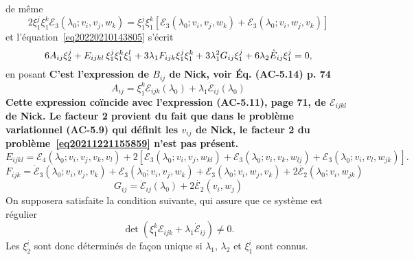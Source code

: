 \documentclass[12pt, final]{amsart}
\begin{document}
de m{\^e}me
\begin{equation}
  2 \xi_1^j \xi_1^k \mathcal{E}_3 (\lambda_0 ; v_i, v_j, w_k) = \xi_1^j
  \xi_1^k  [\mathcal{E}_3 (\lambda_0 ; v_i, v_j, w_k) +\mathcal{E}_3
  (\lambda_0 ; v_i, w_j, v_k)]
\end{equation}
et l'équation~\eqref{eq20220210143805} s'écrit
\begin{equation}
  \label{eq20220216141706} 6 A_{i  j} \xi_2^j + E_{i  j
   k  l}  \hspace{0.17em} \xi_1^j \xi_1^k \xi_1^l + 3
  \lambda_1 F_{i  j  k} \xi_1^j \xi_1^k + 3 \lambda_1^2 G_{i
   j} \xi_1^j + 6 \lambda_2  \mathring{E}_{i  j} \xi_1^j = 0,
\end{equation}
en posant \textbf{C'est l'expression de $B_{ij}$ de Nick, voir Éq.
(AC-5.14) p. 74}
\begin{equation}
  A_{i  j} = \xi_1^k \mathcal{E}_{i  j  k} (\lambda_0)
  + \lambda_1  \dot{\mathcal{E}}_{i  j} (\lambda_0)
\end{equation}
\textbf{Cette expression co{\"i}ncide avec l'expression (AC-5.11), page 71,
de $\mathcal{E}_{i  j  k  l}$ de Nick. Le facteur 2
provient du fait que dans le problème variationnel (AC-5.9) qui
définit les $v_{i  j}$ de Nick, le facteur 2 du
problème~\eqref{eq20211221155859} n'est pas présent.}
\begin{equation}
  E_{i  j  k  l} =\mathcal{E}_4  (\lambda_0 ; v_i,
  v_j, v_k, v_l) + 2 [\mathcal{E}_3 (\lambda_0 ; v_i, v_j, w_{k  l})
  +\mathcal{E}_3 (\lambda_0 ; v_i, v_k, w_{l  j}) +\mathcal{E}_3
  (\lambda_0 ; v_i, v_l, w_{j  k})] .
\end{equation}
\begin{equation}
  F_{i  j  k} = \dot{\mathcal{E}}_3  (\lambda_0 ; v_i, v_j,
  v_k) +\mathcal{E}_3  (\lambda_0 ; v_i, v_j, w_k) +\mathcal{E}_3  (\lambda_0
  ; v_i, w_j, v_k) + 2 \dot{\mathcal{E}_2} (\lambda_0 ; v_i, w_{j  k})
\end{equation}
\begin{equation}
  G_{i  j} = \ddot{\mathcal{E}}_{i  j} (\lambda_0) + 2
  \dot{\mathcal{E}_2} (v_i, w_j)
\end{equation}
On supposera satisfaite la condition suivante, qui assure que ce système
est régulier
\begin{equation}
  \det (\xi_1^k \mathcal{E}_{i  j  k} + \lambda_1
  \dot{\mathcal{E}}_{i  j}) \neq 0.
\end{equation}
Les $\xi_2^i$ sont donc déterminés de fa{\c c}on unique si
$\lambda_1$, $\lambda_2$ et $\xi_1^i$ sont connus.
\end{document}
